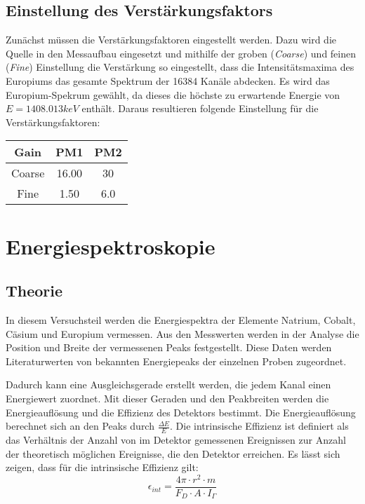 \documentclass{../Misc/MontavonLaTeX/Montavon}
\begin{document}
\subsection{Einstellung des Verstärkungsfaktors}
Zunächst müssen die Verstärkungsfaktoren eingestellt werden. Dazu wird die  Quelle in den Messaufbau eingesetzt und mithilfe der groben (\emph{Coarse}) und feinen (\emph{Fine}) Einstellung die Verstärkung so eingestellt, dass die Intensitätsmaxima des Europiums das gesamte Spektrum der 16384 Kanäle abdecken. Es wird das Europium-Spekrum gewählt, da dieses die höchste zu erwartende Energie von $E = 1408.013 \unit{keV}$ enthält. Daraus resultieren folgende Einstellung für die Verstärkungsfaktoren:

\begin{table}[htbp]
\centering
\begin{tabular}{|c|c|c|} \hline Gain & PM1 & PM2 \\
\hline
Coarse  & 16.00 & 30 \\
Fine & 1.50 & 6.0 \\
\hline 
\end{tabular}
\end{table}


\section{Energiespektroskopie}
\subsection{Theorie}
In diesem Versuchsteil werden die Energiespektra der Elemente Natrium, Cobalt, Cäsium und Europium vermessen. Aus den Messwerten werden in der Analyse die Position und Breite der vermessenen Peaks festgestellt.
Diese Daten werden Literaturwerten von bekannten Energiepeaks der einzelnen Proben zugeordnet. 

Dadurch kann eine Ausgleichsgerade erstellt werden, die jedem Kanal einen Energiewert zuordnet. Mit dieser Geraden und den Peakbreiten werden die Energieauflösung und die Effizienz des Detektors bestimmt. Die Energieauflösung berechnet sich an den Peaks durch $\frac{\Delta E}{E}$. Die intrinsische Effizienz ist definiert als das Verhältnis der Anzahl von im Detektor gemessenen Ereignissen zur Anzahl der theoretisch möglichen Ereignisse, die den Detektor erreichen. Es lässt sich zeigen, dass für die intrinsische Effizienz gilt:
\begin{equation}
\epsilon_{int} = \frac{4\pi \cdot r^{2} \cdot m}{F_{D} \cdot A \cdot I_{\Gamma}}
\label{eq:Effizienz}
\end{equation}
\end{document}
